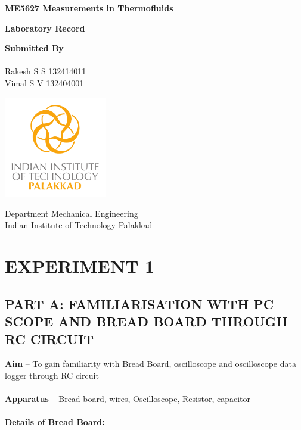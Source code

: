 \documentclass[9pt]{scrreprt}
\begin{document}
\begin{titlepage}
   \begin{center}
       \large
       \vspace*{1cm}

       \textbf{ME5627 Measurements in Thermofluids }

       \vspace{0.5cm}
       
       \textbf{Laboratory Record}
       
       \vspace{6cm}

       \textbf{Submitted By\\~\\}
       {Rakesh S S 132414011 \\Vimal S V 132404001}


       \vspace{4cm}
     
       {\includegraphics[width=4.5cm]{logos/iitpkd_fulllogo_color.pdf} \\}
       
       \vspace{2cm}   
       
       Department Mechanical Engineering\\
       Indian Institute of Technology Palakkad

   \end{center}
\end{titlepage}
\newpage

\chapter*{\normalsize EXPERIMENT 1}
\setcounter{chapter}{1}
\section*{\normalsize PART A: FAMILIARISATION WITH PC SCOPE AND BREAD BOARD THROUGH
RC CIRCUIT}
\textbf{Aim} – To gain familiarity with Bread Board, oscilloscope and oscilloscope data logger through RC circuit\\
\\
\textbf{Apparatus} – Bread board, wires, Oscilloscope, Resistor, capacitor\\
\\
\textbf{Details of Bread Board:}
\end{document}
